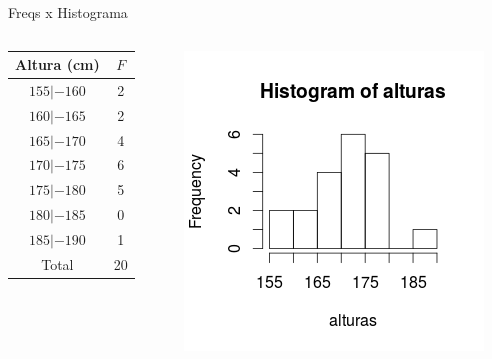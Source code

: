 \documentclass{beamer}
\begin{document}
\begin{frame}{Freqs x Histograma}
  \begin{columns}
    \begin{column}{5cm}
\centering\begin{tabular}{|c|c|}
  \hline
  Altura (cm) & $F$ \\
  \hline
  $155 |- 160$ & 2 \\%
  $160 |- 165$ & 2 \\%
  $165 |- 170$ & 4 \\%
  $170 |- 175$ & 6 \\%
  $175 |- 180$ & 5 \\%
  $180 |- 185$ & 0 \\%
  $185 |- 190$ & 1 \\%
  \hline
  \hline
  Total & 20 \\
  \hline
\end{tabular}
    \end{column}
    \begin{column}{5cm}
      \begin{center}
        \includegraphics[width=\textwidth]{Desc_I/histograma}
      \end{center}
    \end{column}
  \end{columns}
\end{frame}
\end{document}
